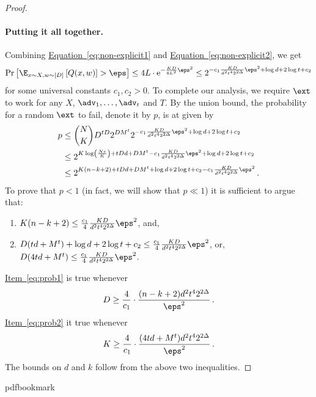\documentclass[11pt]{article}
\numberwithin{equation}{section}
\theoremstyle{definition}
\theoremstyle{plain}
\newcommand{\eee}{\mathrm e}
\newcommand{\expeqref}[2]{\hyperref[#2]{#1~\eqref{#2}}}
\begin{document}
\begin{proof}
\paragraph*{Putting it all together.}   %
Combining \expeqref{Equation}{eq:non-explicit1} and \expeqref{Equation}{eq:non-explicit2}, we get
\[
\Pr\left[\E_{x \sim X,w \sim [D]}\left[ Q(x,w) \right] > \eps\right] \le 4L \cdot
\eee^{-\frac{KD}{8L^2}\eps^2}
\le 2^{-c_{1}\frac{KD}{d^{2}t^{4}2^{2\Delta}}\eps^{2}+\log d + 2\log t + c_2}
\]
for some universal constants $c_1,c_2 > 0$. To complete our analysis, we require $\ext$
to work for any $X$, $\adv_1,\ldots,\adv_t$ and $T$. By the union bound, the probability
for a random $\ext$ to fail, denote it by $p$, is at given by
\begin{align*}
p &\le \binom{N}{K}D^{tD}2^{DM^t}2^{-c_{1}\frac{KD}{d^{2}t^{4}2^{2\Delta}}\eps^{2}+\log d + 2\log t + c_2} \\
&\le 2^{K\log\left( \frac{Ne}{K} \right) + tDd + DM^t - c_{1}\frac{KD}{d^{2}t^{4}2^{2\Delta}}\eps^{2}+\log d + 2\log t + c_2} \\
&\le 2^{K(n-k+2)+tDd+DM^t +\log d +2\log t + c_2 - c_{1}\frac{KD}{d^{2}t^{4}2^{2\Delta}}\eps^{2}}\,.
\end{align*}
To prove that $p < 1$ (in fact, we will show that $p \ll 1$) it is sufficient to argue that:
\begin{enumerate}
\item\label{eq:prob1}  $K(n-k+2) \le \frac{c_1}{4}\frac{KD}{d^{2}t^{4}2^{2\Delta}}\eps^{2}$, and,
\item\label{eq:prob2}  $D(td+M^t) +\log d +2\log t + c_2  \le \frac{c_1}{4}\frac{KD}{d^{2}t^{4}2^{2\Delta}}\eps^{2}$, or, $D(4td+M^t) \le \frac{c_1}{4}\frac{KD}{d^{2}t^{4}2^{2\Delta}}\eps^{2}$.
\end{enumerate}
\expeqref{Item}{eq:prob1} is true whenever 
\[
D \ge \frac{4}{c_1} \cdot \frac{(n-k+2)d^{2}t^{4}2^{2\Delta}}{\eps^2}\,.
\]
\expeqref{Item}{eq:prob2} it true whenever
\[
K \ge \frac{4}{c_1} \cdot \frac{(4td+M^t)d^{2}t^{4}2^{2\Delta}}{\eps^2}\,.
\]
The bounds on $d$ and $k$ follow from the above two inequalities.
\end{proof}







\newcommand{\prelim}{Preliminary version in\ }\newcommand{\prelims}{Preliminary
  versions in\ }
\providecommand{\bibhead}[1]{}
\expandafter\ifx\csname pdfbookmark\endcsname\relax%
  \providecommand{\tocrefpdfbookmark}{}
\else\providecommand{\tocrefpdfbookmark}{%
   \hypertarget{tocreferences}{}%
   \pdfbookmark[1]{References}{tocreferences}}%
\fi
\end{document}
